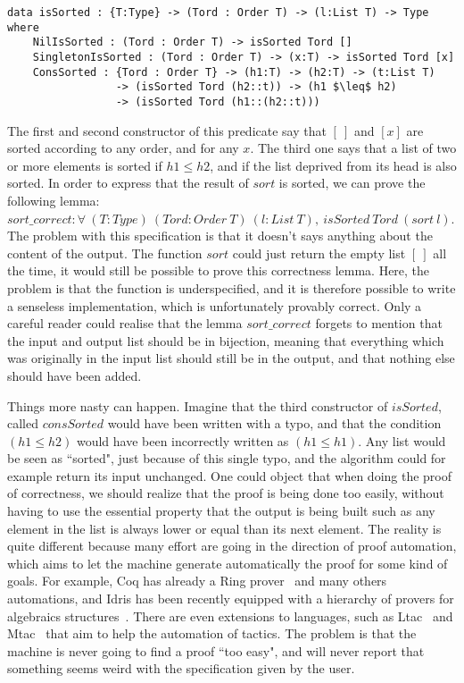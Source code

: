 \begin{lstlisting}
data isSorted : {T:Type} -> (Tord : Order T) -> (l:List T) -> Type where
    NilIsSorted : (Tord : Order T) -> isSorted Tord []
    SingletonIsSorted : (Tord : Order T) -> (x:T) -> isSorted Tord [x]
    ConsSorted : {Tord : Order T} -> (h1:T) -> (h2:T) -> (t:List T) 
                 -> (isSorted Tord (h2::t)) -> (h1 $\leq$ h2) 
                 -> (isSorted Tord (h1::(h2::t)))
\end{lstlisting}
The first and second constructor of this predicate say that $[\ ]$ and $[x]$ are sorted according to any order, and for any $x$. The third one says that a list of two or more elements is sorted if $h1 \le h2$, and if the list deprived from its head is also sorted. In order to express that the result of $sort$ is sorted, we can prove the following lemma:
$sort\_correct : \forall\ (T:Type)\ (Tord:Order\ T)\ (l:List\ T),\ isSorted\ Tord\ (sort\ l)$. The problem with this specification is that it doesn't says anything about the content of the output. The function $sort$ could just return the empty list $[\ ]$ all the time, it would still be possible to prove this correctness lemma. Here, the problem is that the function is underspecified, and it is therefore possible to write a senseless implementation, which is unfortunately provably correct. Only a careful reader could realise that the lemma $sort\_correct$ forgets to mention that the input and output list should be in bijection, meaning that everything which was originally in the input list should still be in the output, and that nothing else should have been added.

Things more nasty can happen. Imagine that the third constructor of $isSorted$, called $consSorted$ would have been written with a typo, and that the condition $(h1 \leq h2) $ would have been incorrectly written as $(h1 \leq h1)$. Any list would be seen as ``sorted", just because of this single typo, and the algorithm could for example return its input unchanged. One could object that when doing the proof of correctness, we should realize that the proof is being done too easily, without having to use the essential property that the output is being built such as any element in the list is always lower or equal than its next element. The reality is quite different because many effort are going in the direction of proof automation, which aims to let the machine generate automatically the proof for some kind of goals. For example, Coq has already a Ring prover~\cite{coq2005} and many others automations, and Idris has been recently equipped with a hierarchy of provers for algebraics structures~\cite{Slama2016}. There are even extensions to languages, such as Ltac~\cite{DelahayeLTac} and Mtac~\cite{Ziliani13} that aim to help the automation of tactics. The problem is that the machine is never going to find a proof ``too easy", and will never report that something seems weird with the specification given by the user.


